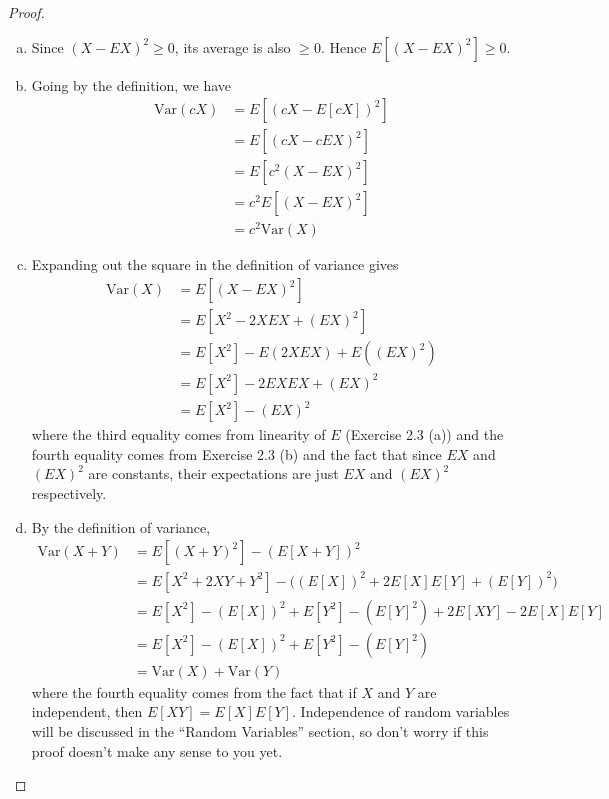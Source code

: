\documentclass{tufte-book}
\newcommand\var{\text{Var}}
\theoremstyle{definition}
\numberwithin{theorem}{section}
\numberwithin{definition}{section}
\numberwithin{lemma}{section}
\numberwithin{corollary}{section}
\numberwithin{proposition}{section}
\numberwithin{remark}{section}
\numberwithin{claim}{section}
\numberwithin{observation}{section}
\numberwithin{fact}{section}
\numberwithin{assumption}{section}
\numberwithin{example}{section}
\numberwithin{exercise}{section}
\begin{document}
\begin{proof}
$ $
\begin{enumerate}[(a)]
\item Since $(X - EX)^2 \geq 0$, its average is also $\geq 0$. Hence $E[(X - EX)^2] \geq 0$.

\item Going by the definition, we have
\begin{align*}
\var(cX) &= E[(cX - E[cX])^2] \\
&= E[(cX - cEX)^2] \\
&= E[c^2(X - EX)^2 ] \\
&= c^2 E[(X - EX)^2] \\
&= c^2 \var(X)
\end{align*}

\item Expanding out the square in the definition of variance gives
\begin{align*}
\var(X) &= E[(X - EX)^2] \\
&= E[X^2 - 2XEX + (EX)^2] \\
&= E[X^2] - E(2XEX) + E((EX)^2) \\
&= E[X^2] - 2EXEX + (EX)^2 \\
&= E[X^2] - (EX)^2
\end{align*}
where the third equality comes from linearity of $E$ (Exercise 2.3 (a)) and the fourth equality comes from Exercise 2.3 (b) and the fact that since $EX$ and $(EX)^2$ are constants, their expectations are just $EX$ and $(EX)^2$ respectively.

\item By the definition of variance,
\begin{align*}
    \var(X+Y) &= E[(X+Y)^2] - (E[X+Y])^2 \\
    &= E[X^2 + 2XY + Y^2] - \Big((E[X])^2 + 2E[X]E[Y] + (E[Y])^2\Big) \\
    &= E[X^2] - (E[X])^2 + E[Y^2] - (E[Y]^2) + 2E[XY] - 2E[X]E[Y] \\
    &= E[X^2] - (E[X])^2 + E[Y^2] - (E[Y]^2) \\
    &= \var(X) + \var(Y)
\end{align*}
where the fourth equality comes from the fact that if $X$ and $Y$ are independent, then $E[XY] = E[X]E[Y]$. Independence of random variables will be discussed in the ``Random Variables'' section, so don't worry if this proof doesn't make any sense to you yet.
\end{enumerate}
\end{proof}
\end{document}
